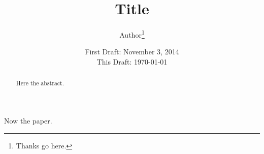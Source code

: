 



\title{Title}
\author{Author\thanks{Thanks go here.}}
\date{First Draft: November 3, 2014 \\ This Draft: \today}
\maketitle

\begin{abstract}
\noindent Here the abstract.
\end{abstract}

\noindent Now the paper.

